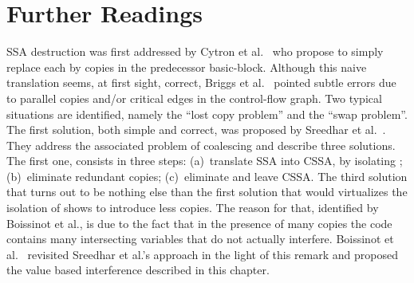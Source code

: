 
\section{Further Readings}
SSA destruction was first addressed by Cytron et al.~\cite{CFR+91} who propose to simply replace each \phifun by copies in the predecessor basic-block. 
Although this naive translation seems, at first sight, correct, Briggs et al.~\cite{BriggsSSA} pointed subtle errors due to parallel copies and/or critical edges in the control-flow graph. 
Two typical situations are identified, namely the ``lost copy problem'' and the ``swap problem''. 
The first solution, both simple and correct, was proposed by Sreedhar et al.~\cite{VC+99}. 
They address the associated problem of coalescing and describe three solutions. 
The first one, consists in three steps: 
(a)~translate SSA into CSSA, by isolating \phifuns; 
(b)~eliminate redundant copies; 
(c)~eliminate \phifuns and leave CSSA. 
The third solution that turns out to be nothing else than the first solution that would virtualizes the isolation of \phifuns shows to introduce less copies. 
The reason for that, identified by Boissinot et al., is due to the fact that in the presence of many copies the code contains many intersecting variables that do not actually interfere. 
Boissinot et al.~\cite{Boissinot09} revisited Sreedhar et al.'s approach in the light of this remark and proposed the value based interference described in this chapter.

